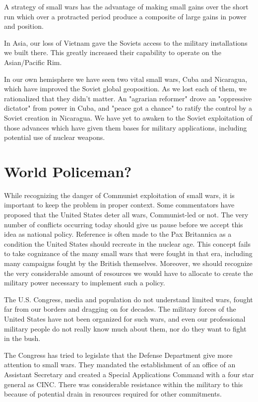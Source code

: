 A strategy of small wars has the advantage of making small gains over the short run which over a protracted period produce a composite of large gains in power and position.

In Asia, our loss of Vietnam gave the Soviets access to the military installations we built there. This greatly increased their capability to operate on the Asian/Pacific Rim.

In our own hemisphere we have seen two vital small wars, Cuba and Nicaragua, which have improved the Soviet global geoposition. As we lost each of them, we rationalized that they didn't matter. An "agrarian reformer" drove an "oppressive dictator" from power in Cuba, and "peace got a chance" to ratify the control by a Soviet creation in Nicaragua. We have yet to awaken to the Soviet exploitation of those advances which have given them bases for military applications, including potential use of nuclear weapons.

\section{World Policeman?}
While recognizing the danger of Communist exploitation of small wars, it is important to keep the problem in proper context. Some commentators have proposed that the United States deter all wars, Communist-led or not. The very number of conflicts occurring today should give us pause before we accept this idea as national policy. Reference is often made to the Pax Britannica as a condition the United States should recreate in the nuclear age. This concept fails to take cognizance of the many small wars that were fought in that era, including many campaigns fought by the British themselves. Moreover, we should recognize the very considerable amount of resources we would have to allocate to create the military power necessary to implement such a policy.

The U.S. Congress, media and population do not understand limited wars, fought far from our borders and dragging on for decades. The military forces of the United States have not been organized for such wars, and even our professional military people do not really know much about them, nor do they want to fight in the bush.

The Congress has tried to legislate that the Defense Department give more attention to small wars. They mandated the establishment of an office of an Assistant Secretary and created a Special Applications Command with a four star general as CINC. There was considerable resistance within the military to this because of potential drain in resources required for other commitments.

